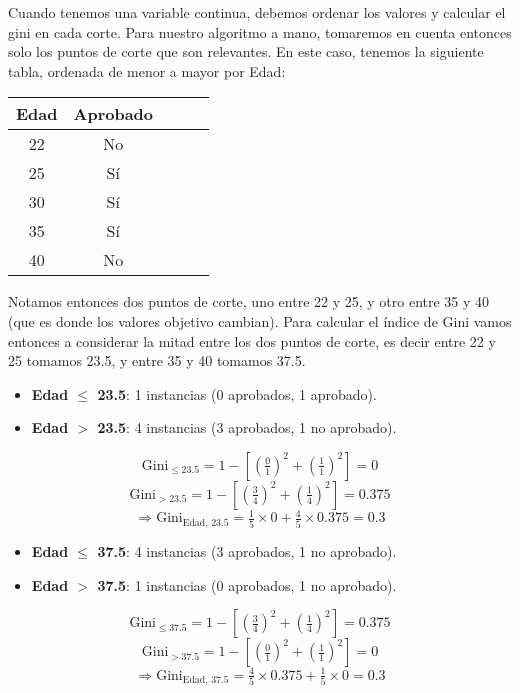 \documentclass[12pt]{article}
\begin{document}
Cuando tenemos una variable continua, debemos ordenar los valores y calcular el gini en cada corte. Para nuestro algoritmo a mano, tomaremos en cuenta entonces solo los puntos de corte que son relevantes. En este caso, tenemos la siguiente tabla, ordenada de menor a mayor por Edad:

\begin{table}[h]
  \centering
  \begin{tabular}{ccccc}
    \toprule
    Edad & Aprobado \\
    \midrule
    22 & No \\
    25 & Sí \\
    30 & Sí \\
    35 & Sí \\
    40 & No \\
    \bottomrule
  \end{tabular}
\end{table}

Notamos entonces dos puntos de corte, uno entre 22 y 25, y otro entre 35 y 40 (que es donde los valores objetivo cambian). Para calcular el índice de Gini vamos entonces a considerar la mitad entre los dos puntos de corte, es decir entre 22 y 25 tomamos 23.5, y entre 35 y 40 tomamos 37.5.

\begin{itemize}
  \item \textbf{Edad $\leq$ 23.5}: 1 instancias (0 aprobados, 1 aprobado).
  \item \textbf{Edad $>$ 23.5}: 4 instancias (3 aprobados, 1 no aprobado).
\end{itemize}

\[
  \mathrm{Gini}_{\leq 23.5} = 1 - \left[\left(\tfrac{0}{1}\right)^2 + \left(\tfrac{1}{1}\right)^2\right] = 0
\]
\[
  \mathrm{Gini}_{> 23.5} = 1 - \left[\left(\tfrac{3}{4}\right)^2 + \left(\tfrac{1}{4}\right)^2\right] = 0.375
\]
\[
  \Rightarrow \mathrm{Gini}_{\text{Edad, 23.5}} = \tfrac{1}{5}\times0 + \tfrac{4}{5}\times0.375 = 0.3
\]

\begin{itemize}
  \item \textbf{Edad $\leq$ 37.5}: 4 instancias (3 aprobados, 1 no aprobado).
  \item \textbf{Edad $>$ 37.5}: 1 instancias (0 aprobados, 1 no aprobado).
\end{itemize}

\[
  \mathrm{Gini}_{\leq 37.5} = 1 - \left[\left(\tfrac{3}{4}\right)^2 + \left(\tfrac{1}{4}\right)^2\right] = 0.375
\]
\[
  \mathrm{Gini}_{> 37.5} = 1 - \left[\left(\tfrac{0}{1}\right)^2 + \left(\tfrac{1}{1}\right)^2\right] = 0
\]
\[
  \Rightarrow \mathrm{Gini}_{\text{Edad, 37.5}} = \tfrac{4}{5}\times0.375 + \tfrac{1}{5}\times0 = 0.3
\]
\end{document}
